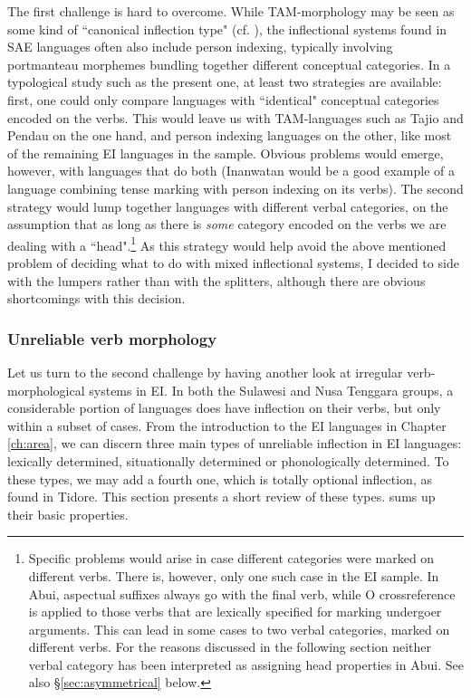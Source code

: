 The first challenge is hard to overcome. While TAM-morphology may be seen as some kind of ``canonical inflection type" (cf. \citealt{foley2010events}), the inflectional systems found in SAE languages often also include person indexing, typically involving portmanteau morphemes bundling together different conceptual categories. In a typological study such as the present one, at least two strategies are available: first, one could only compare languages with ``identical" conceptual categories encoded on the verbs. This would leave us with TAM-languages such as Tajio and Pendau on the one hand, and person indexing languages on the other, like most of the remaining EI languages in the sample. Obvious problems would emerge, however, with languages that do both (Inanwatan would be a good example of a language combining tense marking with person indexing on its verbs). The second strategy would lump together languages with different verbal categories, on the assumption that as long as there is \emph{some} category encoded on the verbs we are dealing with a ``head".\footnote{Specific problems would arise in case different categories were marked on different verbs. There is, however, only one such case in the EI sample. In Abui, aspectual suffixes always go with the final verb, while O crossreference is applied to those verbs that are lexically specified for marking undergoer arguments. This can lead in some cases to two verbal categories, marked on different verbs. For the reasons discussed in the following section neither verbal category has been interpreted as assigning head properties in Abui. See also §\ref{sec:asymmetrical} below.} As this strategy would help avoid the above mentioned problem of deciding what to do with mixed inflectional systems, I decided to side with the lumpers rather than with the splitters, although there are obvious shortcomings with this decision. 
 
\subsubsection{Unreliable verb morphology} \label{sec:unreliable}

Let us turn to the second challenge by having another look at irregular verb-morphological systems in EI. In both the Sulawesi and Nusa Tenggara groups, a considerable portion of languages does have inflection on their verbs, but only within a subset of cases. From the introduction to the EI languages in Chapter \ref{ch:area}, we can discern three main types of unreliable inflection in EI languages: lexically determined, situationally determined or phonologically determined. To these types, we may add a fourth one, which is totally optional inflection, as found in Tidore. This section presents a short review of these types.  sums up their basic properties.

